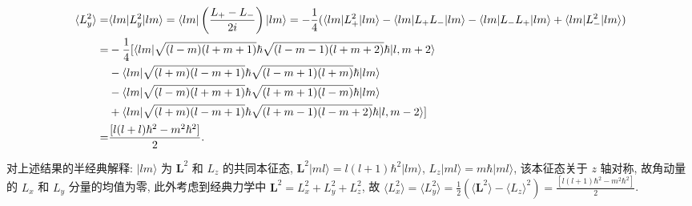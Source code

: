\documentclass{assignment}
\begin{document}
\begin{pf}
\begin{align}
        \notag\langle L_y^2\rangle=&\langle lm\rvert L_y^2\lvert lm\rangle=\langle lm\rvert\left(\frac{L_+-L_-}{2i}\right)\lvert lm\rangle=-\frac{1}{4}(\langle lm\rvert L_+^2\lvert lm\rangle-\langle lm\rvert L_+L_-\lvert lm\rangle-\langle lm\rvert L_-L_+\lvert lm\rangle+\langle lm\rvert L_-^2\lvert lm\rangle)\\
        \notag=&-\frac{1}{4}[\langle lm\rvert\sqrt{(l-m)(l+m+1)}\hbar\sqrt{(l-m-1)(l+m+2)}\hbar\lvert l,m+2\rangle\\
        \notag&-\langle lm\rvert\sqrt{(l+m)(l-m+1)}\hbar\sqrt{(l-m+1)(l+m)}\hbar\lvert lm\rangle\\
        \notag&-\langle lm\rvert\sqrt{(l-m)(l+m+1)}\hbar\sqrt{(l+m+1)(l-m)}\hbar\lvert lm\rangle\\
        \notag&+\langle lm\rvert\sqrt{(l+m)(l-m+1)}\hbar\sqrt{(l+m-1)(l-m+2)}\hbar\lvert l,m-2\rangle]\\
        =&\frac{[l(l+l)\hbar^2-m^2\hbar^2]}{2}.
    \end{align}

    对上述结果的半经典解释: $\lvert lm\rangle$ 为 $\bm{L}^2$ 和 $L_z$ 的共同本征态, $\bm{L}^2\lvert ml\rangle=l(l+1)\hbar^2\lvert lm\rangle$, $L_z\lvert ml\rangle=m\hbar\lvert ml\rangle$, 该本征态关于 $z$ 轴对称, 故角动量的 $L_x$ 和 $L_y$ 分量的均值为零, 此外考虑到经典力学中 $\bm{L}^2=L_x^2+L_y^2+L_z^2$, 故 $\langle L_x^2\rangle=\langle L_y^2\rangle=\frac{1}{2}(\langle\bm{L}^2\rangle-\langle L_z\rangle^2)=\frac{[l(l+1)\hbar^2-m^2\hbar^2]}{2}$.
\end{pf}
\end{document}
